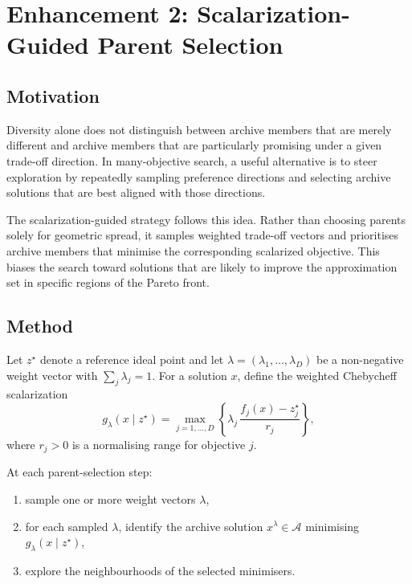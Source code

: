 \documentclass[11pt,a4paper]{article}
\newcommand{\calA}{\ensuremath{\mathcal{A}}}
\begin{document}
\section{Enhancement 2: Scalarization-Guided Parent Selection}\label{sec:scalarized}

\subsection{Motivation}

Diversity alone does not distinguish between archive members that are
merely different and archive members that are particularly promising
under a given trade-off direction.  In many-objective search, a useful
alternative is to steer exploration by repeatedly sampling preference
directions and selecting archive solutions that are best aligned with
those directions.

The scalarization-guided strategy follows this idea.  Rather than
choosing parents solely for geometric spread, it samples weighted
trade-off vectors and prioritises archive members that minimise the
corresponding scalarized objective.  This biases the search toward
solutions that are likely to improve the approximation set in specific
regions of the Pareto front.

\subsection{Method}

Let \(z^\star\) denote a reference ideal point and let
\(\lambda = (\lambda_1,\dots,\lambda_D)\) be a non-negative weight
vector with \(\sum_j \lambda_j = 1\).  For a solution \(x\), define the
weighted Chebycheff scalarization
\[
g_\lambda(x \mid z^\star)
=
\max_{j=1,\dots,D}
\left\{
\lambda_j \,\frac{f_j(x)-z^\star_j}{r_j}
\right\},
\]
where \(r_j > 0\) is a normalising range for objective \(j\).

At each parent-selection step:
\begin{enumerate}
  \item sample one or more weight vectors \(\lambda\),
  \item for each sampled \(\lambda\), identify the archive solution
    \(x^\lambda \in \calA\) minimising \(g_\lambda(x \mid z^\star)\),
  \item explore the neighbourhoods of the selected minimisers.
\end{enumerate}
\end{document}
